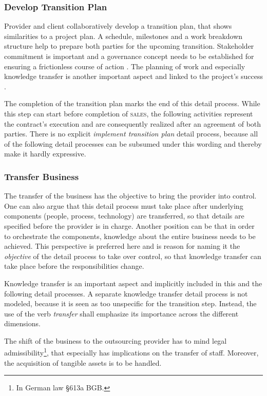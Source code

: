 	\subsubsection{Develop Transition Plan}
	Provider and client collaboratively develop a transition plan, that shows similarities to a project plan. A schedule, milestones and a work breakdown structure help to prepare both parties for the upcoming transition. Stakeholder commitment is important and a governance concept needs to be established for ensuring a frictionless course of action \citep{itgov2005}. The planning of work and especially knowledge transfer is another important aspect and linked to the project's success \citep{deloittehandbook}. 
	
	The completion of the transition plan marks the end of this detail process. While this step can start before completion of \textsc{sales}, the following activities represent the contract's execution and are consequently realized after an agreement of both parties. There is no explicit \textit{implement transition plan} detail process, because all of the following detail processes can be subsumed under this wording and thereby make it hardly expressive. 
	
	\subsubsection{Transfer Business}
	
	The transfer of the business has the objective to bring the provider into control. One can also argue that this detail process must take place after underlying components (\ie people, process, technology) are transferred, so that details are specified before the provider is in charge. Another position can be that in order to orchestrate the components, knowledge about the entire business needs to be achieved. This perspective is preferred here and is reason for naming it the \textit{objective} of the detail process to take over control, so that knowledge transfer can take place before the responsibilities change. 
	
	Knowledge transfer is an important aspect and implicitly included in this and the following detail processes. A separate knowledge transfer detail process is not modeled, because it is seen as too unspecific for the transition step. Instead, the use of the verb \textit{transfer} shall emphasize its importance across the different dimensions. 
	
	The shift of the business to the outsourcing provider has to mind legal admissibility\footnote{In German law \cf §613a BGB. }, that especially has implications on the transfer of staff. Moreover, the acquisition of tangible assets is to be handled. 
	
